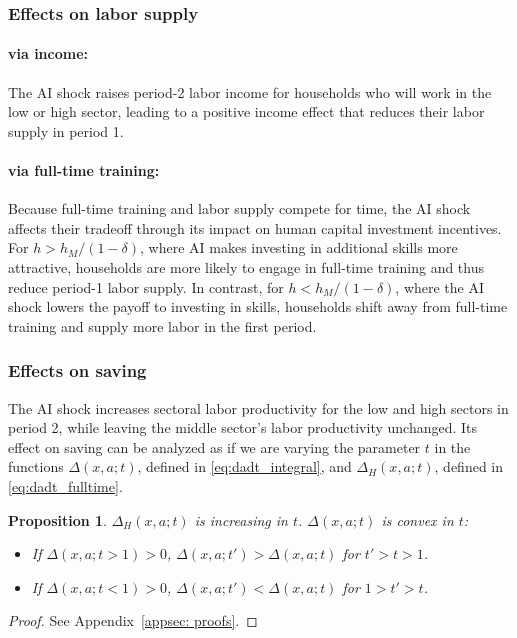 \documentclass[12pt]{article}
\newtheorem{proposition}{Proposition}
\begin{document}
\subsubsection{Effects on labor supply} 
\paragraph{via income:} 
The AI shock raises period-2 labor income for households who will work in the low or high sector, leading to a positive income effect that reduces their labor supply in period 1. 

\paragraph{via full-time training:} Because full-time training and labor supply compete for time, the AI shock affects their tradeoff through its impact on human capital investment incentives. For $h>h_M/(1-\delta)$, where AI makes investing in additional skills more attractive, households are more likely to engage in full-time training and thus reduce period-1 labor supply. In contrast, for $h<h_M/(1-\delta)$, where the AI shock lowers the payoff to investing in skills, households shift away from full-time training and supply more labor in the first period. 


\subsubsection{Effects on saving}

The AI shock increases sectoral labor productivity for the low and high sectors in period 2, while leaving the middle sector's labor productivity unchanged. Its effect on saving can be analyzed as if we are varying the parameter $t$ in the functions $\Delta(x,a;t)$, defined in \eqref{eq:dadt_integral}, and $\Delta_{H}(x,a;t)$, defined in \eqref{eq:dadt_fulltime}. 

\begin{proposition}\label{prop:Delta}
    $\Delta_{H}(x,a;t)$ is increasing in $t$. $\Delta(x,a;t)$ is convex in $t$:
    \begin{itemize}
        \item If $\Delta(x,a;t>1)>0$, $\Delta(x,a;t') > \Delta(x,a;t)$ for $t'>t>1$. 
        \item If $\Delta(x,a;t<1)>0$, $\Delta(x,a;t') < \Delta(x,a;t)$ for $1>t'>t$.
    \end{itemize}
\end{proposition}
\begin{proof}
    See Appendix~\ref{appsec: proofs}.
\end{proof}
\end{document}

